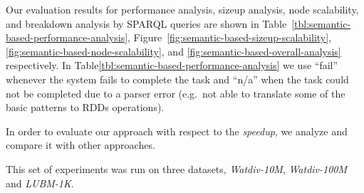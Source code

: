 Our evaluation results for performance analysis, sizeup analysis, node scalability, and breakdown analysis by SPARQL queries are shown in Table~\ref{tbl:semantic-based-performance-analysis}, Figure~\ref{fig:semantic-based-sizeup-scalability}, \ref{fig:semantic-based-node-scalability}, and \ref{fig:semantic-based-overall-analysis} respectively.
In Table\ref{tbl:semantic-based-performance-analysis} we use ``fail'' whenever the system fails to complete the task and ``n/a'' when the task could not be completed due to a parser error (e.g.\ not able to translate some of the basic patterns to RDDs operations).

In order to evaluate our approach with respect to the \textit{speedup}, we analyze and compare it with other approaches.

This set of experiments was run on three datasets, \emph{Watdiv-10M}, \emph{Watdiv-100M} and \emph{LUBM-1K}.

